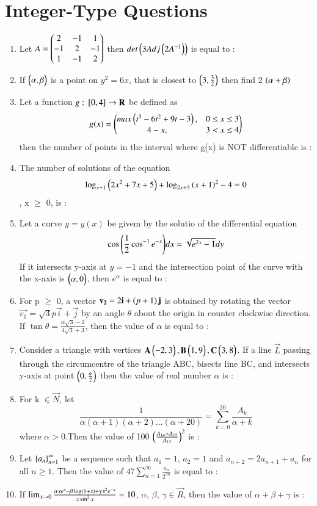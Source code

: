 \documentclass[journal,12pt,onecolumn]{IEEEtran}
\theoremstyle{remark}
\begin{document}
\section{Integer-Type Questions}
\begin{enumerate}
	\item Let $ A = \begin{pmatrix}2 & -1 & 1 \\ -1 & 2 & -1 \\ 1 & -1 & 2\end{pmatrix}$ then $det\left(3Adj\left(2A^{-1}\right)\right)$ is equal to :
	\item If $\begin{pmatrix}\alpha , \beta\end{pmatrix}$ is a point on $y^2=6x$, that is closest to $\begin{pmatrix}3,\frac{3}{2}\end{pmatrix}$ then find 2 $ \left(\alpha+\beta\right) $

	\item Let a function  $g : {}\left[0,4\right] \rightarrow \mathbf{R}$ be defined as
		$$ g(x) = \begin{pmatrix} max\left(t^3-6t^2+9t-3\right), & 0 \leq x \leq 3 \\
		                  4 - x, & 3 < x \leq 4 \end{pmatrix} $$
			then the number of points in the interval  where g(x) is NOT differentiable is :
		\item The number of solutions of the equation $$\log_{x+1}{\left(2x^2+7x+5\right)} + \log_{2x+5}{\left(x+1\right)^2} - 4 = 0$$, x $\geq$ 0, is :

	\item Let a curve $ y = y(x)$ be givem by the solutio of the differential equation $$\cos{\ensuremath{\left(\frac{1}{2}\cos^{-1}{e^{-x}}\right)}} dx = \sqrt{e^{2x} - 1} dy $$If it intersects y-axis at $y=-1$ and the intersection point of the curve with the x-axis is $\begin{pmatrix}\alpha , 0\end{pmatrix}$, then $e^{\alpha}$ is equal to :
	\item For p $\geq$ 0, a vector $\mathbf{v_2} = 2\mathbf{i} + \left(p+1\right)\mathbf{j}$ is obtained by rotating the vector $\vec{v_1} = \sqrt{3}p\vec{i} + \vec{j}$ by an angle $\theta$ about the origin in counter clockwise direction. If $\tan{\theta} = \frac{\alpha\sqrt{3} - 2}{4\sqrt{3} + 3}$, then the value of $\alpha$ is equal to :
	\item Consider a triangle with vertices $\mathbf{A} \begin{pmatrix}-2,3\end{pmatrix}, \mathbf{B} \begin{pmatrix}1,9\end{pmatrix}, \mathbf{C} \begin{pmatrix}3,8\end{pmatrix}$. If a line $\vec{L}$ passing through the circumcentre of the triangle ABC, bisects line BC, and intersects y-axis at point $\begin{pmatrix}0,\frac{\alpha}{2}\end{pmatrix}$ then the value of real number $\alpha$ is :
	\item For k $\in \vec{N}$, let $$ \frac{1}{\alpha(\alpha +1)(\alpha +2)\dots(\alpha +20)} = \sum_{k=0}^{20} \frac{A_k}{\alpha + k} $$ where $\alpha>0$.Then the value of 100 $\left(\frac{A_{14} + A_{15}}{A_{13}}\right)^2 $ is :
	\item Let $\left\{a_{n}\right\}_{n=1}^{\infty}$ be a sequence such that $a_1 = 1$, $a_2 = 1$ and $a_{n+2} = 2a_{n+1} + a_{n}$ for all $n \geq 1$. Then the value of $47 \sum_{n=1}^{\infty} \frac{a_{n}}{2^{3n}}$ is equal to :
	\item If $\lim_{x \to 0} \frac{\alpha xe^{x} - \beta \log\left(1+x\right) + \gamma x^2e^{-x}}{x \sin^{2}{x}} = 10 $, $\alpha$, $\beta$, $\gamma \in \vec{R}$, then the value of $\alpha + \beta + \gamma$ is : 
\end{enumerate}
\end{document}
